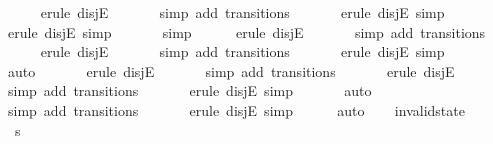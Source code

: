 \begin{isabellebody}
\ \ \ \ \isamarkupfalse%
\ {\isacharparenleft}erule\ disjE{\isacharparenright}\isanewline
\ \ \ \ \ \isamarkupfalse%
\ {\isacharparenleft}simp\ add{\isacharcolon}\ transitions{\isacharparenright}\isanewline
\ \ \ \ \ \isamarkupfalse%
\ {\isacharparenleft}erule\ disjE{\isacharcomma}\ simp{\isacharparenright}\isanewline
\ \ \ \ \ \isamarkupfalse%
\ {\isacharparenleft}erule\ disjE{\isacharcomma}\ simp{\isacharparenright}\isanewline
\ \ \ \ \ \isamarkupfalse%
\ simp\isanewline
\ \ \ \ \isamarkupfalse%
\ {\isacharparenleft}erule\ disjE{\isacharparenright}\isanewline
\ \ \ \ \ \isamarkupfalse%
\ {\isacharparenleft}simp\ add{\isacharcolon}\ transitions{\isacharparenright}\isanewline
\ \ \ \ \isamarkupfalse%
\ {\isacharparenleft}erule\ disjE{\isacharparenright}\isanewline
\ \ \ \ \ \isamarkupfalse%
\ {\isacharparenleft}simp\ add{\isacharcolon}\ transitions{\isacharparenright}\isanewline
\ \ \ \ \ \isamarkupfalse%
\ {\isacharparenleft}erule\ disjE{\isacharcomma}\ simp{\isacharparenright}\isanewline
\ \ \ \ \ \isamarkupfalse%
\ auto{\isacharbrackleft}{}{\isacharbrackright}\isanewline
\ \ \ \ \ \isamarkupfalse%
\ {\isacharparenleft}erule\ disjE{\isacharparenright}\isanewline
\ \ \ \ \ \isamarkupfalse%
\ {\isacharparenleft}simp\ add{\isacharcolon}\ transitions{\isacharparenright}\isanewline
\ \ \ \ \ \isamarkupfalse%
\ {\isacharparenleft}erule\ disjE{\isacharparenright}\isanewline
\ \ \ \ \ \isamarkupfalse%
\ {\isacharparenleft}simp\ add{\isacharcolon}\ transitions{\isacharparenright}\isanewline
\ \ \ \ \ \isamarkupfalse%
\ {\isacharparenleft}erule\ disjE{\isacharcomma}\ simp{\isacharparenright}\isanewline
\ \ \ \ \ \isamarkupfalse%
\ auto{\isacharbrackleft}{}{\isacharbrackright}\isanewline
\ \ \ \ \ \isamarkupfalse%
\ {\isacharparenleft}simp\ add{\isacharcolon}\ transitions{\isacharparenright}\isanewline
\ \ \ \ \ \isamarkupfalse%
\ {\isacharparenleft}erule\ disjE{\isacharcomma}\ simp{\isacharparenright}\isanewline
\ \ \ \ \isamarkupfalse%
\ auto\isanewline
\ \ \isamarkupfalse%
%
\endisatagproof
{\isafoldproof}%
%
\isadelimproof
\isanewline
%
\endisadelimproof
\isanewline
{}\isamarkupfalse%
\ invalid{\isacharunderscore}state{\isacharcolon}\isanewline
\ \ {\isachardoublequoteopen}s\ {\isasymnoteq}\ {}\ {\isasymLongrightarrow}\isanewline

\end{isabellebody}
